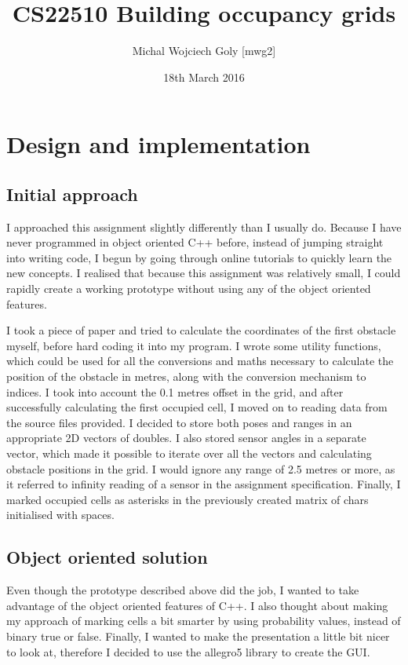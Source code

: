 \documentclass[a4paper, 12pt]{article}
\title{CS22510 Building occupancy grids}
\author{Michal Wojciech Goly [mwg2]}
\date{18th March 2016}
\begin{document}
\maketitle

\section{Design and implementation}
\subsection{Initial approach}
I approached this assignment slightly differently than I usually do.
Because I have never programmed in object oriented C++ before, instead of
jumping straight into writing code, I begun by going through online
tutorials to quickly learn the new concepts. I realised that because this
assignment was relatively small, I could rapidly create a working prototype
without using any of the object oriented features. 

I took a piece of paper and tried to calculate the coordinates of the first
obstacle myself, before hard coding it into my program. I wrote some utility
functions, which could be used for all the conversions and maths necessary 
to calculate the position of the obstacle in metres, along with the conversion
mechanism to indices. I took into account the 0.1 metres offset in the grid,
and after successfully calculating the first occupied cell, I moved on to 
reading data from the source files provided. I decided to store both poses
and ranges in an appropriate 2D vectors of doubles. I also stored sensor 
angles in a separate vector, which made it possible to iterate over all the
vectors and calculating obstacle positions in the grid. I would ignore 
any range of 2.5 metres or more, as it referred to infinity reading of a 
sensor in the assignment specification. Finally, I marked occupied cells as
asterisks in the previously created matrix of chars initialised with spaces. 

\subsection{Object oriented solution}
Even though the prototype described above did the job, I wanted to take advantage
of the object oriented features of C++. I also thought about making my 
approach of marking cells a bit smarter by using probability values, instead of
binary true or false. Finally, I wanted to make the presentation a little bit
nicer to look at, therefore I decided to use the allegro5\cite{1} library to 
create the GUI. 
\end{document}
